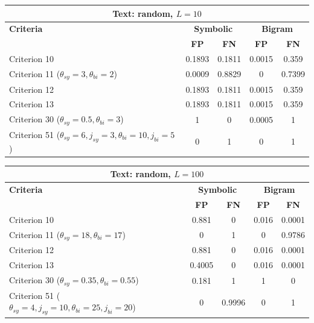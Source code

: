 \begin{center}
\renewcommand{\arraystretch}{1.2}
\setlength{\tabcolsep}{6pt}
\begin{tabular}{|l||c|c||c|c|}
\hline
\multicolumn{5}{|c|}{\textbf{Text: random, $L=10$}} \\
\hline
\textbf{Criteria} & \multicolumn{2}{c||}{\textbf{Symbolic}} & \multicolumn{2}{c|}{\textbf{Bigram}} \\
\hline
 & \textbf{FP} & \textbf{FN} & \textbf{FP} & \textbf{FN} \\
\hline
Criterion 10 & 0.1893 & 0.1811 & 0.0015 & 0.359 \\
Criterion 11 ($\theta_{sy}=3, \theta_{bi}=2$) & 0.0009 & 0.8829 & 0 & 0.7399 \\
Criterion 12 & 0.1893 & 0.1811 & 0.0015 & 0.359 \\
Criterion 13 & 0.1893 & 0.1811 & 0.0015 & 0.359 \\
Criterion 30 ($\theta_{sy}=0.5, \theta_{bi}=3$) & 1 & 0 & 0.0005 & 1 \\
Criterion 51 ($\theta_{sy}=6, j_{sy}=3, \theta_{bi}=10, j_{bi}=5$) & 0 & 1 & 0 & 1 \\
\hline
\end{tabular}
\end{center}

\begin{center}
\renewcommand{\arraystretch}{1.2}
\setlength{\tabcolsep}{6pt}
\begin{tabular}{|l||c|c||c|c|}
\hline
\multicolumn{5}{|c|}{\textbf{Text: random, $L=100$}} \\
\hline
\textbf{Criteria} & \multicolumn{2}{c||}{\textbf{Symbolic}} & \multicolumn{2}{c|}{\textbf{Bigram}} \\
\hline
 & \textbf{FP} & \textbf{FN} & \textbf{FP} & \textbf{FN} \\
\hline
Criterion 10 & 0.881 & 0 & 0.016 & 0.0001 \\
Criterion 11 ($\theta_{sy}=18, \theta_{bi}=17$) & 0 & 1 & 0 & 0.9786 \\
Criterion 12 & 0.881 & 0 & 0.016 & 0.0001 \\
Criterion 13 & 0.4005 & 0 & 0.016 & 0.0001 \\
Criterion 30 ($\theta_{sy}=0.35, \theta_{bi}=0.55$) & 0.181 & 1 & 1 & 0 \\
Criterion 51 ($\theta_{sy}=4, j_{sy}=10, \theta_{bi}=25, j_{bi}=20$) & 0 & 0.9996 & 0 & 1 \\
\hline
\end{tabular}
\end{center}

